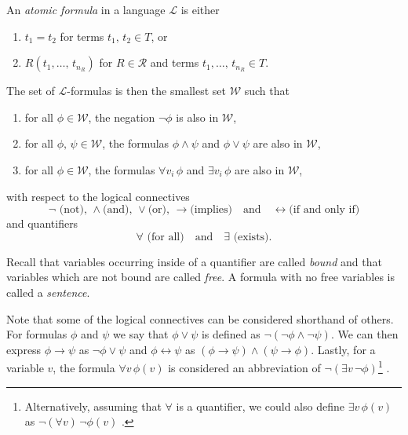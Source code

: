 \documentclass[../../main.tex]{subfiles}
\begin{document}
\begin{definition}\cite[Definition 1.1.5]{Mar02}\label{formula-def}
    An \textit{atomic formula} in a language $\mathcal{L}$ is either
    \begin{enumerate}
        \item $t_1 = t_2$ for terms $t_1,\, t_2 \in T$, or   
        \item $R(t_1,\ldots,\, t_{n_R})$ for $R \in \mathcal{R}$ and terms $t_1,\ldots,\, t_{n_R} \in T$.
    \end{enumerate}
    The set of $\mathcal{L}$-formulas is then the smallest set $\mathcal{W}$ such that
    \begin{enumerate}[label=(\roman*)]
        \item for all $\phi \in \mathcal{W}$, the negation $\lnot \phi$ is also in $\mathcal{W}$,
        \item for all $\phi,\, \psi \in \mathcal{W}$, the formulas $\phi \wedge \psi$ and $\phi \vee \psi$ are also in $\mathcal{W}$,
        \item for all $\phi \in \mathcal{W}$, the formulas $\forall v_i \, \phi$ and $\exists v_i \, \phi$ are also in $\mathcal{W}$,
    \end{enumerate}
    with respect to the logical connectives 
    $$\lnot \text{ (not), } \wedge \text{(and), } \vee \text{(or), } \rightarrow \text{(implies)}\quad \text{and}\quad \leftrightarrow \text{(if and only if)}$$
    and quantifiers $$\forall \text{ (for all)}\quad \text{and}\quad \exists \text{ (exists)}.$$
    
    Recall that variables occurring inside of a quantifier are called \textit{bound} and that variables which are not bound are called \textit{free}.
    A formula with no free variables is called a \textit{sentence}.
\end{definition}

Note that some of the logical connectives can be considered shorthand of others.
For formulas $\phi$ and $\psi$ we say that $\phi \vee \psi$ is defined as $\lnot \left(\lnot \phi \wedge \lnot \psi\right)$.
We can then express $\phi \rightarrow \psi$ as $\lnot \phi \vee \psi$ and $\phi \leftrightarrow \psi$ as $\left(\phi \rightarrow \psi\right) \wedge \left(\psi \rightarrow \phi\right)$.
Lastly, for a variable $v$, the formula $\forall v\,  \phi(v)$ is considered an abbreviation of $\lnot \left(\exists v\, \lnot \phi\right)$\footnote{
    Alternatively, assuming that $\forall$ is a quantifier, we could also define $\exists v\, \phi(v)$ as $\lnot \left(\forall v\right)\, \lnot \phi(v)$ \cite[p.23]{Cha90}.
} \cite[Remark 1.1.7]{Mar02}.
\end{document}
